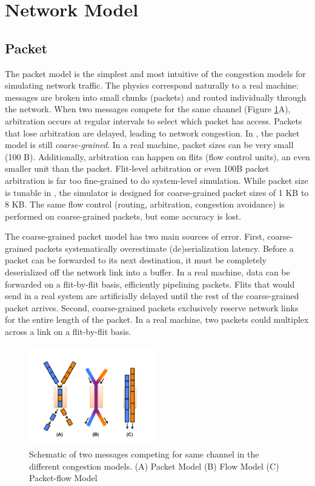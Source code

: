 
\section{Network Model}
\label{sec:tutorial:networkmodel}

\subsection{Packet}
\label{subsec:tutorial:packet}
The packet model is the simplest and most intuitive of the congestion models for simulating network traffic.
The physics correspond naturally to a real machine: messages are broken into small chunks (packets) and routed individually through the network.
When two messages compete for the same channel (Figure \ref{fig:tutorial:congestion}A), arbitration occurs at regular intervals to select which packet has access.
Packets that lose arbitration are delayed, leading to network congestion.
In \sstmacro, the packet model is still \emph{coarse-grained}.
In a real machine, packet sizes can be very small (100 B).
Additionally, arbitration can happen on flits (flow control units), an even smaller unit than the packet.
Flit-level arbitration or even 100B packet arbitration is far too fine-grained to do system-level simulation. 
While packet size is tunable in \sstmacro, the simulator is designed for coarse-grained packet sizes of 1 KB to 8 KB.
The same flow control (routing, arbitration, congestion avoidance) is performed on coarse-grained packets, but some accuracy is lost.

The coarse-grained packet model has two main sources of error.  
First, coarse-grained packets systematically overestimate (de)serialization latency.
Before a packet can be forwarded to its next destination, it must be completely deserialized off the network link into a buffer.
In a real machine, data can be forwarded on a flit-by-flit basis, efficiently pipelining packets.
Flits that would send in a real system are artificially delayed until the rest of the coarse-grained packet arrives.
Second, coarse-grained packets exclusively reserve network links for the entire length of the packet.
In a real machine, two packets could multiplex across a link on a flit-by-flit basis.

\begin{figure}[h]
\centering
\includegraphics[width=0.5\textwidth]{figures/network/congestion.pdf}
\caption{Schematic of two messages competing for same channel in the different \sstmacro congestion models. (A) Packet Model  (B) Flow Model (C) Packet-flow Model }
\label{fig:tutorial:congestion}
\end{figure}

